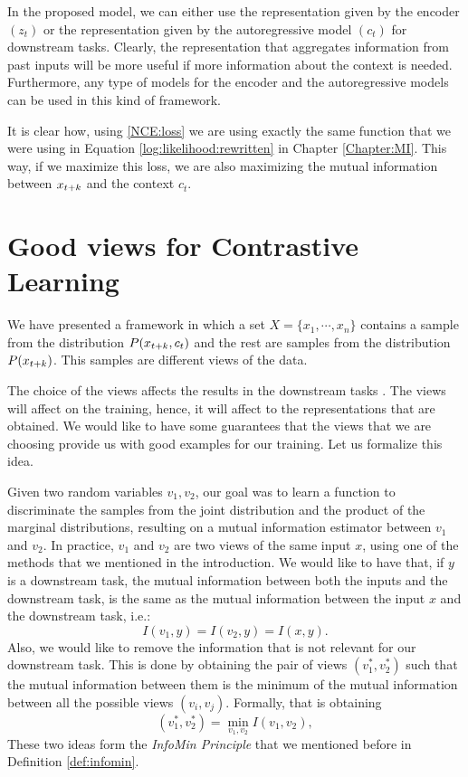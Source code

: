 In the proposed model, we can either use the representation given by the encoder $(z_t)$ or the representation given by the autoregressive model $(c_t)$ for downstream tasks. Clearly, the representation that aggregates information from past inputs will be more useful
if more information about the context is needed. Furthermore, any type of models for the encoder and the autoregressive models can be used in this kind of framework.

It is clear how, using \eqref{NCE:loss} we are using exactly the same function that we were using in Equation \ref{log:likelihood:rewritten} in Chapter \ref{Chapter:MI}. This way, if we maximize this loss, we are also maximizing the mutual information between $x_{t+k}$ and the context $c_t$.

\section{Good views for Contrastive Learning}

We have presented a framework in which a set $X = \{x_1,\cdots,x_n\}$ contains a sample from the distribution $P(x_{t+k},c_t)$ and the rest are samples from the distribution $P(x_{t+k})$. This samples are different views of the data. 

The choice of the views affects the results in the downstream tasks \citep{tian_what_2020}. The views will affect on the training, hence, it will affect to the representations that are obtained. We would like to have some guarantees that the views that we are choosing provide us with good examples for our training. Let us formalize this idea.

Given two random variables $v_1,v_2$, our goal was to learn a function to discriminate the samples from the joint distribution and the product of the marginal distributions, resulting on a mutual information estimator between $v_1$ and $v_2$. In practice, $v_1$ and $v_2$ are two views of the same input $x$, using one of the methods that we mentioned in the introduction. We would like to have that, if $y$ is a downstream task, the mutual information between both the inputs and the downstream task, is the same as the mutual information between the input $x$ and the downstream task, i.e.:
\[
I(v_1,y) = I(v_2,y) = I(x,y).  
\]
Also, we would like to remove the information that is not relevant for our downstream task. This is done by obtaining the pair of views $(v_1^*,v_2^*)$ such that the mutual information between them is the minimum of the mutual information between all the possible views $(v_i,v_j)$. Formally, that is obtaining
\[
(v_1^*, v_2^*) = \min_{v_1,v_2} I (v_1,v_2),    
\]
These two ideas form the \emph{InfoMin Principle} that we mentioned before in Definition \ref{def:infomin}.


